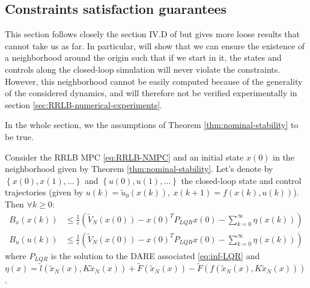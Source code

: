 \documentclass[12pt]{article}
\begin{document}
\subsection{Constraints satisfaction guarantees}\label{sec:constraints-satisfaction-guarantees}
This section follows closely the section IV.D of \cite{RRLB-linear-MPC} but gives more loose results that cannot take us as far.
In particular, will show that we can ensure the existence of a neighborhood around the origin such that if we start in it, the states and controls along the closed-loop simulation will never violate the constraints.
However, this neighborhood cannot be easily computed because of the generality of the considered dynamics, and will therefore not be verified experimentally in section \ref{sec:RRLB-numerical-experiments}.

In the whole section, we the assumptions of Theorem \ref{thm:nominal-stability} to be true.

\begin{lemma}
	\label{thm:RRLB-bounds-guarantees}
	Consider the RRLB MPC \ref{eq:RRLB-NMPC} and an initial state $x(0)$ in the neighborhood given by Theorem \ref{thm:nominal-stability}.
	Let's denote by $\left\{x(0),x(1),\dots\right\}$ and $\left\{u(0), u(1),\dots\right\}$ the closed-loop state and control trajectories (given by $u(k)=\tilde{u}_0(x(k)),~x(k+1)=f(x(k),u(k))$).
	Then $\forall k\geq 0$:
	\begin{align*}
		B_x(x(k))&\leq\frac{1}{\epsilon}\left(\tilde{V}_N(x(0))-x(0)^TP_{LQR}x(0)-\sum_{k=0}^\infty\eta(x(k))\right)\\
		B_u(u(k))&\leq\frac{1}{\epsilon}\left(\tilde{V}_N(x(0))-x(0)^TP_{LQR}x(0)-\sum_{k=0}^\infty\eta(x(k))\right)
	\end{align*}
	where $P_{LQR}$ is the solution to the DARE associated \ref{eq:inf-LQR} and $\eta(x)=\tilde{l}(\tilde{x}_N(x),K\tilde{x}_N(x))+\tilde{F}(\tilde{x}_N(x))-\tilde{F}(f(\tilde{x}_N(x), K\tilde{x}_N(x)))$.
\end{lemma}
\end{document}
